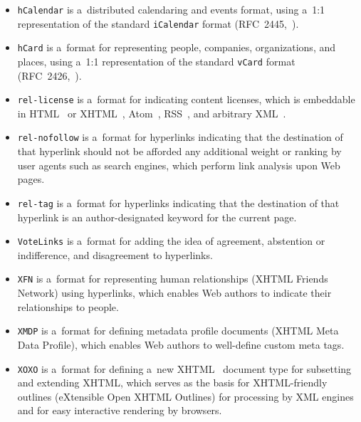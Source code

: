 \begin{itemize}
  \item \texttt{hCalendar} is a~distributed calendaring and
        events format, using a~1:1 representation of the standard
        \texttt{iCalendar} format
        (RFC~2445,~\cite{dawson1998icalendar}).
  \item \texttt{hCard} is a~format for representing people,
        companies, organizations, and places, using a~1:1
        representation of the standard \texttt{vCard} format
        (RFC~2426,~\cite{dawson1998vcard}).
  \item \texttt{rel-license} is a~format for indicating content
        licenses, which is embeddable in
        HTML~\cite{raggett1999html} or
        XHTML~\cite{pemberton2000xhtml},
        Atom~\cite{nottingham2005atom},
        RSS~\cite{cadenhead2006rss},
        and arbitrary XML~\cite{bray2008xml}.
  \item \texttt{rel-nofollow} is a~format for hyperlinks
        indicating that the destination of that hyperlink should
        not be afforded any additional weight or ranking by user
        agents such as search engines, which perform link
        analysis upon Web pages.
  \item \texttt{rel-tag} is a~format for hyperlinks indicating
        that the destination of that hyperlink is an
        author-designated keyword for the current page.
  \item \texttt{VoteLinks} is a~format for adding the idea of
        agreement, abstention or indifference, and disagreement
        to hyperlinks.
  \item \texttt{XFN} is a~format for representing human
        relationships (XHTML Friends Network) using hyperlinks, which enables Web authors
        to indicate their relationships to people.
  \item \texttt{XMDP} is a~format for defining metadata profile
        documents (XHTML Meta Data Profile), which enables Web
        authors to well-define custom meta tags.
  \item \texttt{XOXO} is a~format for defining a~new
        XHTML~\cite{pemberton2000xhtml}
        document type for subsetting and extending XHTML,
        which serves as the basis for XHTML-friendly outlines
        (eXtensible Open XHTML Outlines) for processing by XML engines
        and for easy interactive rendering by browsers.
\end{itemize}

